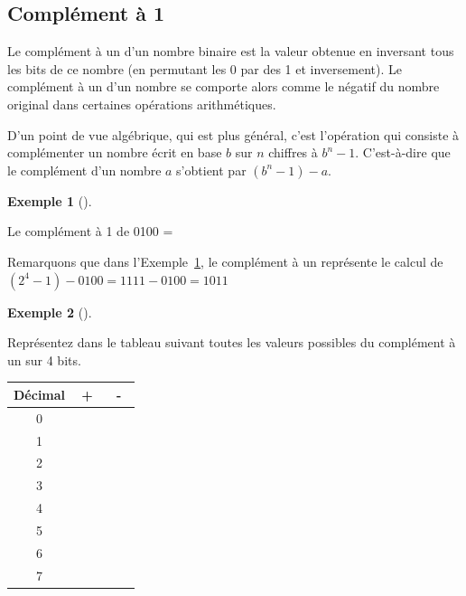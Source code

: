 \documentclass[
  letterpaper,
]{scrbook}
\theoremstyle{plain}
\theoremstyle{definition}
\newtheorem{example}{Exemple}[chapter]
\theoremstyle{definition}
\theoremstyle{remark}
\begin{document}
\hypertarget{compluxe9ment-uxe0-1}{%
\subsection{Complément à 1}\label{compluxe9ment-uxe0-1}}

Le complément à un d'un nombre binaire est la valeur obtenue en
inversant tous les bits de ce nombre (en permutant les 0 par des 1 et
inversement). Le complément à un d'un nombre se comporte alors comme le
négatif du nombre original dans certaines opérations arithmétiques.

D'un point de vue algébrique, qui est plus général, c'est l'opération
qui consiste à complémenter un nombre écrit en base \(b\) sur \(n\)
chiffres à \(b^n-1\). C'est-à-dire que le complément d'un nombre \(a\)
s'obtient par \((b^n−1)−a\).

\leavevmode{}%
\begin{example}[]\label{exm-complement-a-un}

Le complément à 1 de 0100 =

\end{example}

\begin{tcolorbox}[enhanced jigsaw, opacityback=0, rightrule=.15mm, breakable, toprule=.15mm, colbacktitle=quarto-callout-note-color!10!white, title=\textcolor{quarto-callout-note-color}{\faInfo}\hspace{0.5em}{Note}, titlerule=0mm, arc=.35mm, colback=white, coltitle=black, colframe=quarto-callout-note-color-frame, bottomtitle=1mm, toptitle=1mm, bottomrule=.15mm, leftrule=.75mm, left=2mm, opacitybacktitle=0.6]

Remarquons que dans l'Exemple~\ref{exm-complement-a-un}, le complément à
un représente le calcul de \((2^4-1)-0100=1111-0100=1011\)

\end{tcolorbox}

\leavevmode{}%
\begin{example}[]\label{exm-complement-a-un-4-bits}

Représentez dans le tableau suivant toutes les valeurs possibles du
complément à un sur 4 bits.

\begin{longtable}[]{@{}ccc@{}}
\toprule()
\textbf{Décimal} & \textbf{+} & \textbf{-} \\
\midrule()
\endhead
0 & \(\phantom{000}\) & \(\phantom{000}\) \\
1 & & \\
2 & & \\
3 & & \\
4 & & \\
5 & & \\
6 & & \\
7 & & \\
\bottomrule()
\end{longtable}

\end{example}
\end{document}
